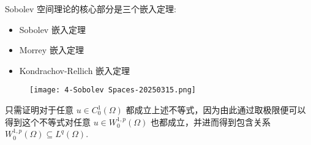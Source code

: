 Sobolev 空间理论的核心部分是三个嵌入定理:

\begin{itemize}
	\item Sobolev 嵌入定理
	\item Morrey 嵌入定理
	\item Kondrachov-Rellich 嵌入定理
\end{itemize}

\begin{theorem}
\begin{figure}[H]
\centering
\texttt{[image: 4-Sobolev Spaces-20250315.png]}
\label{}
\end{figure}\label{c2cf0d}
\end{theorem}

只需证明对于任意 $u\in C^{1}_{0}(\Omega)$ 都成立上述不等式，因为由此通过取极限便可以得到这个不等式对任意 $u\in W_0^{1,p}(\Omega)$ 也都成立，并进而得到包含关系 $W_0^{1,p}(\Omega)\subseteq L^{q}(\Omega)$.

